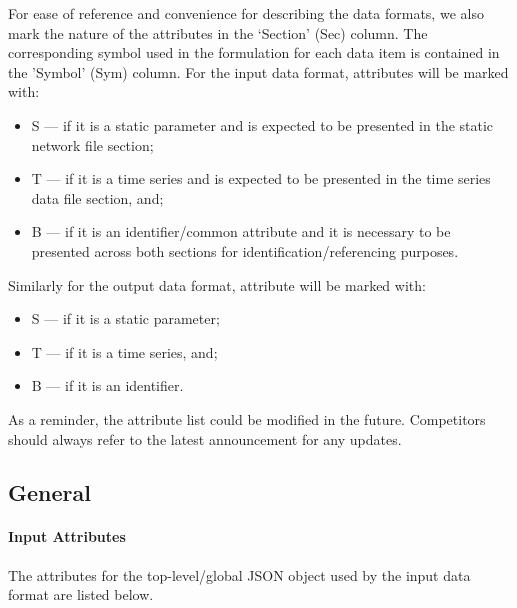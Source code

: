 \documentclass{article}
\begin{document}
For ease of reference and convenience for describing the data formats, we also 
mark the nature of the attributes in the `Section' (Sec) column. The corresponding symbol used in the formulation for each data item is contained in the 'Symbol' (Sym) column.
For the input data format, attributes will be marked with:
\begin{itemize}
\item S --- if it is a static parameter and is expected to be presented in the static network file section;
\item T --- if it is a time series and is expected to be presented in the time series data file section, and; 
\item B --- if it is an identifier/common attribute and it is necessary to be presented across both sections for identification/referencing purposes.
\end{itemize}
Similarly for the output data format, attribute will be marked with:
\begin{itemize}
\item S --- if it is a static parameter; 
\item T --- if it is a time series, and;
\item B --- if it is an identifier.
\end{itemize}
As a reminder, the attribute list could be modified in the future.
Competitors should always refer to the latest announcement for any 
updates.





\subsection{General}
\label{nom:top-level}

\paragraph{Input Attributes}
The attributes for the top-level/global JSON object 
used by the input data format are listed below.
\end{document}
